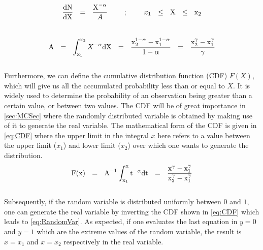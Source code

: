 \begingroup
\Large
\begin{equation}
 \frac{\textnormal{dN}}{\textnormal{dX}}~~=~~\frac{\textnormal{X}^{-\alpha}}{A}~~~~~~~;~~~~~~~x_1 ~~\leq ~~\textnormal{X}~~ \leq ~~\textnormal{x}_2
 \label{eq:PowerLaw_1}
\end{equation}
\endgroup\\

\begingroup
\Large
\begin{equation}
 \textnormal{A}~~=~~\int_{\textnormal{x}_1}^{\textnormal{x}_2} X^{-\alpha} \textnormal{dX}~~=~~\frac{\textnormal{x}_2^{1 - \alpha} - \textnormal{x}_1^{1 - \alpha}}{1 - \alpha}~~=~~\frac{\textnormal{x}_2^{\gamma} - \textnormal{x}_1^{\gamma}}{\gamma} 
 \label{eq:NormConst}
\end{equation}
\endgroup\\

Furthermore, we can define the cumulative distribution function (CDF) $F(X)$, which will give us all the accumulated probability less than or equal to $X$. It is widely used to determine the probability of an observation being greater than a certain value, or between two values. The CDF will be of great importance in \autoref{sec:MCSec} where the randomly distributed variable is obtained by making use of it to generate the real variable. The mathematical form of the CDF is given in \autoref{eq:CDF} where the upper limit in the integral $x$ here refers to a value between the upper limit ($x_1$) and lower limit ($x_2$) over which one wants to generate the distribution.\\ 

\begingroup
\Large
\begin{equation}
 \textnormal{F}(\textnormal{x})~~=~~\textnormal{A}^{-1} \int_{\textnormal{x}_1}^{\textnormal{x}} \textnormal{t}^{-\alpha} \textnormal{dt}~~=~~\frac{\textnormal{x}^{\gamma} - \textnormal{x}_1^{\gamma}}{\textnormal{x}_2^{\gamma} - \textnormal{x}_1^{\gamma}}
 \label{eq:CDF}
\end{equation}
\endgroup\\

Subsequently, if the random variable is distributed uniformly between $0$ and $1$, one can generate the real variable by inverting the CDF shown in \autoref{eq:CDF} which leads to \autoref{eq:RandomVar}. As expected, if one evaluates the last equation in $y = 0$ and $y = 1$ which are the extreme values of the random variable, the result is $x = x_1$ and $x = x_2$ respectively in the real variable.\\


